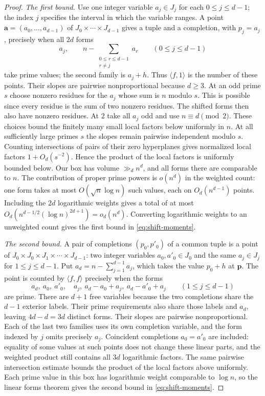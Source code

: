 \begin{proof}
\emph{The first bound.} Use one integer variable $a_j\in J_j$ for each
$0\le j\le d-1$; the index $j$ specifies the interval in which the variable
ranges. A point $\boldsymbol a=(a_0,\ldots,a_{d-1})$ of
$J_0\times\cdots\times J_{d-1}$ gives a tuple and a completion, with
$p_j=a_j$, precisely when all $2d$ forms
\[
 a_j,\qquad n-\sum_{\substack{0\le r\le d-1\\r\ne j}}a_r
 \qquad (0\le j\le d-1)
\]
take prime values; the second family is $a_j+h$. Thus $\langle f,1\rangle$
is the number of these points.
Their slopes are pairwise nonproportional because $d\ge3$.
At an odd prime $s$ choose nonzero residues for the $a_j$ whose sum
is $n$ modulo $s$. This is possible since every residue is the sum
of two nonzero residues. The shifted forms then also have nonzero
residues. At $2$ take all $a_j$ odd and use $n\equiv d\pmod 2$.
These choices bound the finitely many small local factors below
uniformly in $n$. At all sufficiently large primes $s$ the slopes remain
pairwise independent modulo $s$. Counting intersections of pairs
of their zero hyperplanes gives normalized local factors
$1+O_d(s^{-2})$. Hence the product of the local factors is uniformly
bounded below. Our box has volume $\gg_d n^d$, and all forms there
are comparable to $n$. The contribution of proper prime powers is
$o(n^d)$ in the weighted count: one form takes at most
$O(\sqrt n\log n)$ such values, each on $O_d(n^{d-1})$ points.
Including the $2d$ logarithmic weights gives a total of at most
$O_d(n^{d-1/2}(\log n)^{2d+1})=o_d(n^d)$.
Converting logarithmic weights to an unweighted count gives the first
bound in \eqref{eq:shift-moments}.

\emph{The second bound.} A pair of completions $(p_0,p'_0)$ of a common
tuple is a point of $J_0\times J_0\times J_1\times\cdots\times J_{d-1}$:
two integer variables $a_0,a'_0\in J_0$ and the same $a_j\in J_j$ for
$1\le j\le d-1$. Put $a_d=n-\sum_{j=1}^{d-1}a_j$, which takes the value
$p_0+h$ at $\boldsymbol p$. The point is counted by $\langle f,f\rangle$
precisely when the forms
\[
 a_d,\ a_0,\ a'_0,\quad
 a_j,\ a_d-a_0+a_j,\ a_d-a'_0+a_j \qquad(1\le j\le d-1)
\]
are prime. There are $d+1$ free variables because the two completions share the
$d-1$ exterior labels. Their prime requirements also share those labels
and $a_d$, leaving $4d-d=3d$ distinct forms. Their slopes are pairwise
nonproportional. Each of the last two families uses its own completion
variable, and the form indexed by $j$ omits precisely $a_j$.
Coincident completions $a_0=a'_0$ are included: equality of some values
at such points does not change these linear parts, and the weighted
product still contains all $3d$ logarithmic factors. The same pairwise intersection
estimate bounds the product of the local factors above uniformly.
Each prime value in this box has logarithmic weight comparable to
$\log n$, so the linear forms theorem gives the second bound in
\eqref{eq:shift-moments}.


\end{proof}
